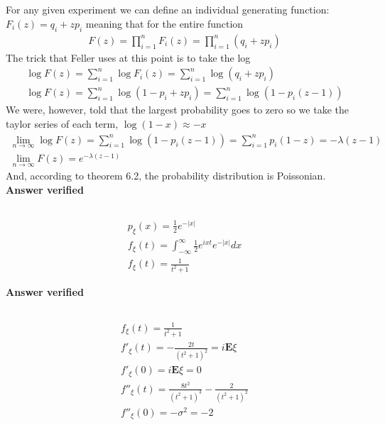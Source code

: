 \subsection{}
For any given experiment we can define an individual generating function: $F_i(z) = q_i + z p_i$ meaning that for the entire function
\begin{eqnarray}
	F(z) = \prod_{i=1}^n F_i(z) = \prod_{i=1}^n (q_i + z p_i)
\end{eqnarray}
The trick that Feller uses at this point is to take the log
\begin{eqnarray}
	\log F(z) = \sum_{i=1}^n \log F_i(z) = \sum_{i=1}^n \log (q_i + z p_i) \\
	\log F(z) = \sum_{i=1}^n \log (1 - p_i + z p_i) = \sum_{i=1}^n \log (1 - p_i( z -1))
\end{eqnarray}
We were, however, told that the largest probability goes to zero so we take the taylor series of each term, $\log (1-x) \approx - x$
\begin{eqnarray}
	\lim_{n \rightarrow \infty} \log F(z) =  \sum_{i=1}^n \log (1 - p_i( z -1)) = \sum_{i=1}^n  p_i( 1 - z ) = - \lambda (z - 1) \\
	\lim_{n \rightarrow \infty} F(z) = e^{- \lambda (z - 1)}
\end{eqnarray}
And, according to theorem 6.2, the probability distribution is Poissonian.
\textbf{Answer verified}


\subsection{}

\begin{eqnarray}
	p_{\xi}(x) = \frac{1}{2} e^{-|x|} \\
	f_{\xi}(t) = \int_{-\infty}^{\infty} \frac{1}{2} e^{ i x t } e^{-|x|} dx \\
	f_{\xi}(t) = \frac{1}{t^2+1}
\end{eqnarray}

\textbf{Answer verified}

\subsection{}
\begin{eqnarray}
	f_{\xi}(t) = \frac{1}{t^2+1} \\
	f'_{\xi}(t) =  -\frac{2 t}{\left(t^2+1\right)^2} = i \textbf{E}\xi \\
	f'_{\xi}(0) =  i \textbf{E}\xi = 0 \\
	f''_{\xi}(t) = \frac{8 t^2}{\left(t^2+1\right)^3}-\frac{2}{\left(t^2+1\right)^2} \\
	f''_{\xi}(0) = - \sigma^2 = -2
\end{eqnarray}


